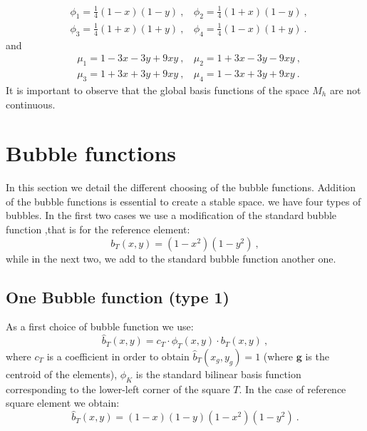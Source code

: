 \documentclass[a4paper,11pt]{article}
\begin{document}
%
\begin{equation}
\begin{split}
&\phi_{1}=\frac{1}{4}(1-x)(1-y) \:, \:\:\:\: \phi_{2}=\frac{1}{4}(1+x)(1-y) \:,\\
&\phi_{3}=\frac{1}{4}(1+x)(1+y) \:, \:\:\:\: \phi_{4}=\frac{1}{4}(1-x)(1+y) \:.
\end{split}
\end{equation}   
and
\begin{equation}
\begin{split}
&\mu_{1} = 1 - 3x - 3y + 9xy \:, \:\:\:\: \mu_{2} = 1 + 3x - 3y - 9xy \:,\\
&\mu_{3} = 1 + 3x + 3y + 9xy \:, \:\:\:\: \mu_{4} = 1 - 3x + 3y + 9xy \:.
\end{split}
\end{equation}
It is important to observe that the global basis functions of the space $M_{h}$ are not continuous.
   
\section{Bubble functions}
In this section we detail the different choosing of the bubble functions. Addition of the bubble functions is essential to create a stable space. we have four types of bubbles.
In the first two cases we use a modification of the standard bubble function ,that is for the reference element:
\begin{equation}\label{eq:standard_bubble_fun}
b_{T}(x,y) = (1-x^{2})(1-y^{2})\:,
\end{equation}
while in the next two, we add to the standard bubble function another one.
\subsection{One Bubble function (type 1)}
As a first choice of bubble function we use:
\begin{equation}\label{eq:bubble_1}
\hat{b}_{T}(x,y) = c_{T}\cdot\phi_{T}(x,y)\cdot b_{T}(x,y)\:, 
\end{equation}
where $c_{T}$ is a coefficient in order to obtain $\hat{b}_{T}(x_{g},y_{g}) = 1$ (where $\bm{g}$ is the centroid of the elements), $\phi_{K}$ is the standard bilinear basis function corresponding to the lower-left corner of the square $T$.
In the case of reference square element we obtain:
\begin{equation} \label{eq:bubble_1_ref}
\hat{b}_{T}(x,y) = (1-x)(1-y)(1-x^{2})(1-y^{2})\:.
\end{equation}
\end{document}
